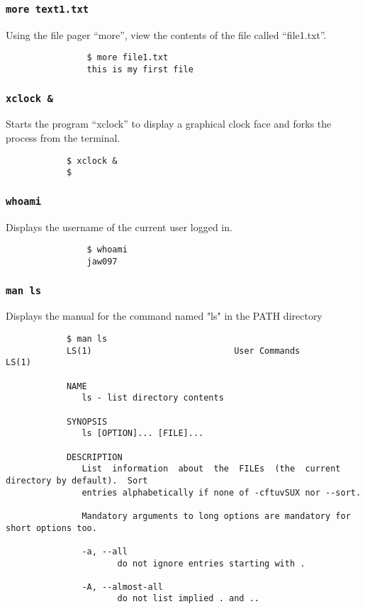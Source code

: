\documentclass[11pt]{article} %
\newcommand{\code}[1]{\texttt{#1}}
\begin{document}
	\subsubsection{\code{more text1.txt}}
		Using the file pager ``more'', view the contents of the file called ``file1.txt''.
			\begin{verbatim}
				$ more file1.txt
				this is my first file
			\end{verbatim}
	\subsubsection{\code{xclock \&}}
		Starts the program ``xclock'' to display a graphical clock face and forks the process from the terminal.
		\begin{verbatim}
			$ xclock &
			$
		\end{verbatim}
	\subsubsection{\code{whoami}}
		Displays the username of the current user logged in.
			\begin{verbatim}
				$ whoami
				jaw097
			\end{verbatim}
	\subsubsection{\code{man ls}}
		Displays the manual for the command named "ls" in the PATH directory
		\begin{verbatim}
			$ man ls
			LS(1)                            User Commands                           LS(1)

			NAME
		       ls - list directory contents

			SYNOPSIS
		       ls [OPTION]... [FILE]...

			DESCRIPTION
		       List  information  about  the  FILEs  (the  current  directory by default).  Sort
		       entries alphabetically if none of -cftuvSUX nor --sort.

		       Mandatory arguments to long options are mandatory for short options too.

		       -a, --all
		              do not ignore entries starting with .

		       -A, --almost-all
		              do not list implied . and ..
		\end{verbatim}
\end{document}
